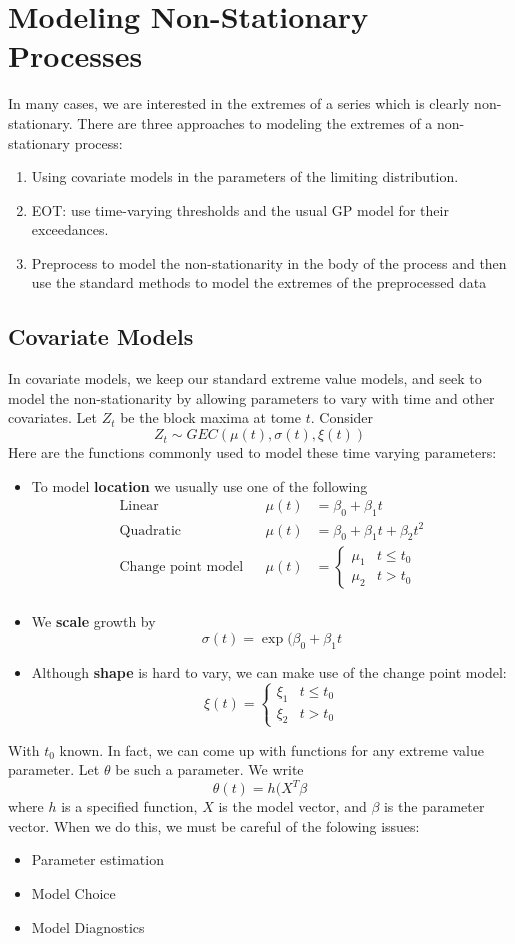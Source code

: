 \documentclass{article}
\theoremstyle{definition}
\theoremstyle{definition}
\begin{document}
\section{Modeling Non-Stationary Processes}
In many cases, we are interested in the extremes of
a series which is clearly non-stationary. There are three approaches to modeling the extremes of a non-stationary process:
\begin{enumerate}
    \item Using covariate models in the parameters of the
limiting distribution.
    \item EOT: use time-varying thresholds and the usual
GP model for their exceedances.
    \item Preprocess to model the non-stationarity in the
body of the process and then use the standard
methods to model the extremes of the preprocessed data
\end{enumerate}

\subsection{Covariate Models}
In covariate models, we keep our standard extreme value models, and seek to model the non-stationarity by
allowing parameters to vary with time and other
covariates. Let $Z_t$ be the block maxima at tome $t$. Consider
\[Z_t \sim GEC(\mu(t), \sigma(t), \xi(t))\]
Here are the functions commonly used to model these time varying parameters:
\begin{itemize}
    \item To model \textbf{location} we usually use one of the following
    \begin{align*}
        \text{Linear} &&\mu(t)&=\beta_0+\beta_1t \\
        \text{Quadratic} && \mu(t)&=\beta_0+\beta_1t+\beta_2t^2\\
        \text{Change point model} &&\mu(t)&=\begin{cases}\mu_1 & t\leq t_0\\ \mu_2 & t> t_0
        \end{cases}\\
    \end{align*}
    \item We \textbf{scale} growth by
    \[\sigma(t)= \exp(\beta_0+\beta_1t\]
    \item Although \textbf{shape} is hard to vary, we can make use of the change point model:
    \[\xi(t)=\begin{cases}\xi_1 & t\leq t_0\\ \xi_2 & t> t_0\end{cases}\]
\end{itemize}
With $t_0$ known. In fact, we can come up with functions for any extreme value parameter. Let $\theta$ be such a parameter. We write
\[\theta(t)= h(X^T\beta\]
where $h$ is a specified function, $X$ is the model vector, and $\beta $ is the parameter vector. When we do this, we must be careful of the folowing issues:
\begin{itemize}
    \item Parameter estimation
    \item Model Choice
    \item Model Diagnostics
\end{itemize}
\end{document}
